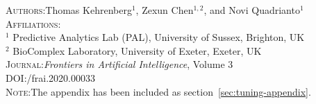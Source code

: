 
% 

% 






% 

\textsc{Authors}:\;\;Thomas Kehrenberg$^1$, Zexun Chen$^{1,2}$, and Novi Quadrianto$^1$ \\
\textsc{Affiliations}:\\
$^1$ Predictive Analytics Lab (PAL), University of Sussex, Brighton, UK\\
$^2$ BioComplex Laboratory, University of Exeter, Exeter, UK \\
\textsc{Journal}:\;\;\textit{Frontiers in Artificial Intelligence}, Volume 3 \\
\textsc{DOI}:\;/frai.2020.00033 \\
\textsc{Note}:\;\;The appendix has been included as section~\ref{sec:tuning-appendix}.

